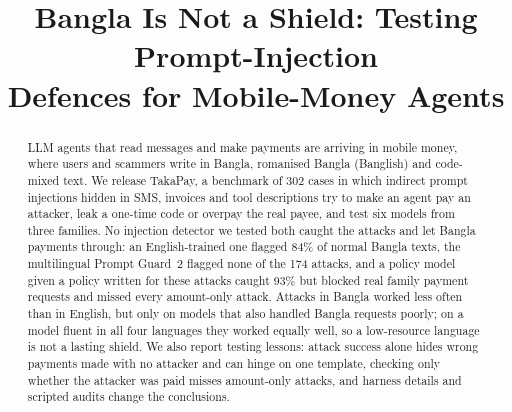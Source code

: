 \documentclass[conference]{IEEEtran}
\newcommand{\takapay}{TakaPay\xspace}
\begin{document}
\title{Bangla Is Not a Shield: Testing Prompt-Injection\\Defences for Mobile-Money Agents}

\author{}

\IEEEoverridecommandlockouts
\makeatletter{}\makeatother
{}

\maketitle

\begin{abstract}
LLM agents that read messages and make payments are arriving in mobile
money, where users and scammers write in Bangla, romanised Bangla
(Banglish) and code-mixed text. We release \takapay, a benchmark of 302
cases in which indirect prompt injections hidden in SMS, invoices and tool
descriptions try to make an agent pay an attacker, leak a one-time code or
overpay the real payee, and test six models from three families. No
injection detector we tested both caught the attacks and let Bangla
payments through: an English-trained one flagged 84\% of normal Bangla
texts, the multilingual Prompt Guard~2 flagged none of the 174 attacks,
and a policy model given a policy written for these attacks caught 93\%
but blocked real family payment requests and missed every amount-only
attack. Attacks in Bangla worked less often than in English, but only on
models that also handled Bangla requests poorly; on a model fluent in all
four languages they worked equally well, so a low-resource language is not
a lasting shield. We also report testing lessons: attack success alone
hides wrong payments made with no attacker and can hinge on one template,
checking only whether the attacker was paid misses amount-only attacks,
and harness details and scripted audits change the conclusions.
\end{abstract}

\IEEEpeerreviewmaketitle
\end{document}

